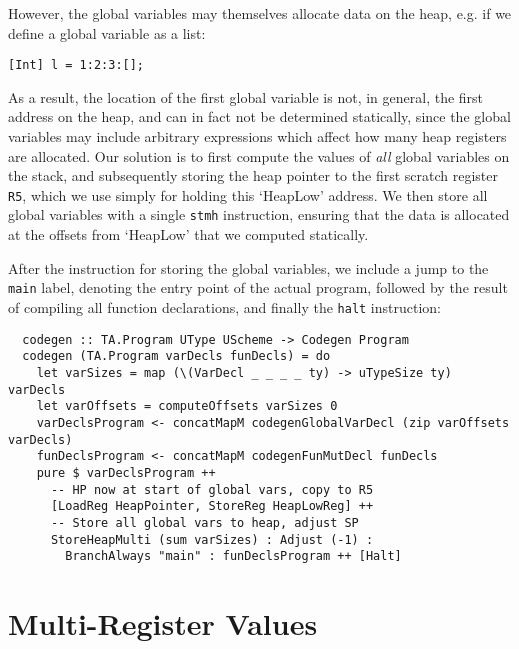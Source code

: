 However, the global variables may themselves allocate data on the heap, e.g. if
we define a global variable as a list:
\begin{lstlisting}[language=spl]
  [Int] l = 1:2:3:[];
\end{lstlisting}
%
As a result, the location of the first global variable is not, in general, the
first address on the heap, and can in fact not be determined statically, since
the global variables may include arbitrary expressions which affect how many
heap registers are allocated.
Our solution is to first compute the values of \emph{all} global variables on
the stack, and subsequently storing the heap pointer to the first scratch
register \texttt{R5}, which we use simply for holding this `HeapLow' address.
We then store all global variables with a single \texttt{stmh} instruction,
ensuring that the data is allocated at the offsets from `HeapLow' that we
computed statically.

After the instruction for storing the global variables, we include a jump to the
\texttt{main} label, denoting the entry point of the actual program, followed by
the result of compiling all function declarations, and finally the \texttt{halt}
instruction:
%
\begin{verbatim}
  codegen :: TA.Program UType UScheme -> Codegen Program
  codegen (TA.Program varDecls funDecls) = do
    let varSizes = map (\(VarDecl _ _ _ _ ty) -> uTypeSize ty) varDecls
    let varOffsets = computeOffsets varSizes 0
    varDeclsProgram <- concatMapM codegenGlobalVarDecl (zip varOffsets varDecls)
    funDeclsProgram <- concatMapM codegenFunMutDecl funDecls
    pure $ varDeclsProgram ++
      -- HP now at start of global vars, copy to R5
      [LoadReg HeapPointer, StoreReg HeapLowReg] ++
      -- Store all global vars to heap, adjust SP
      StoreHeapMulti (sum varSizes) : Adjust (-1) :
        BranchAlways "main" : funDeclsProgram ++ [Halt]
\end{verbatim}



\section{Multi-Register Values} \label{sec:codegen-multi-reg-vals}


